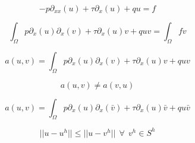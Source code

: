 \documentclass[11pt,fleqn]{article}
\theoremstyle{defstyle}
\begin{document}
\begin{equation}
-p\partial_{xx}(u) + \tau \partial_x(u) + qu = f
\end{equation}

\begin{equation}
\int_\Omega p\partial_{x}(u)\partial_x(v) + \tau \partial_x(u)v + quv = \int_\Omega fv
\end{equation}

\begin{equation}
a(u,v) = \int_\Omega p\partial_{x}(u)\partial_x(v) + \tau \partial_x(u)v + quv
\end{equation}

\begin{equation}
a(u,v) \neq a(v,u)
\end{equation}

\begin{equation}
a(u,v)  = \int_\Omega p\partial_{x}(u)\partial_x(\bar{v}) + \tau \partial_x(u)\bar{v} + qu\bar{v}
\end{equation}

\begin{equation}
||u-u^h|| \leq ||u-v^h||~~\forall~~v^h \in S^h
\end{equation}
\end{document}
